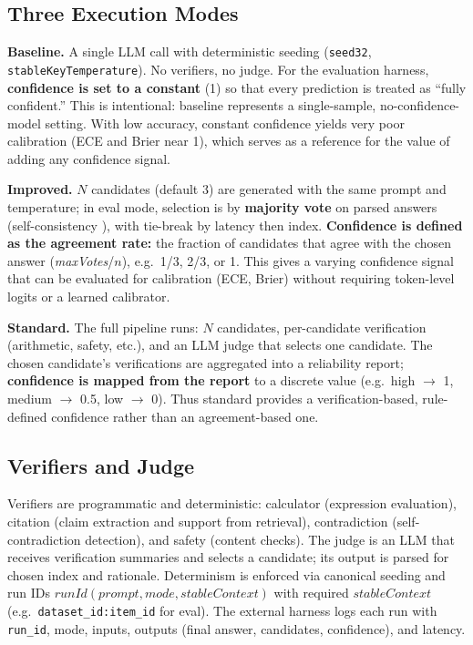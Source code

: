 \documentclass[10pt]{article}
\begin{document}
\subsection{Three Execution Modes}
\textbf{Baseline.} A single LLM call with deterministic seeding (\texttt{seed32}, \texttt{stableKeyTemperature}). No verifiers, no judge. For the evaluation harness, \textbf{confidence is set to a constant} (1) so that every prediction is treated as ``fully confident.'' This is intentional: baseline represents a single-sample, no-confidence-model setting. With low accuracy, constant confidence yields very poor calibration (ECE and Brier near 1), which serves as a reference for the value of adding any confidence signal.

\textbf{Improved.} $N$ candidates (default 3) are generated with the same prompt and temperature; in eval mode, selection is by \textbf{majority vote} on parsed answers (self-consistency \citep{wang2023selfconsistency}), with tie-break by latency then index. \textbf{Confidence is defined as the agreement rate:} the fraction of candidates that agree with the chosen answer (\textit{maxVotes}/$n$), e.g.\ 1/3, 2/3, or 1. This gives a varying confidence signal that can be evaluated for calibration (ECE, Brier) without requiring token-level logits or a learned calibrator.

\textbf{Standard.} The full pipeline runs: $N$ candidates, per-candidate verification (arithmetic, safety, etc.), and an LLM judge that selects one candidate. The chosen candidate's verifications are aggregated into a reliability report; \textbf{confidence is mapped from the report} to a discrete value (e.g.\ high $\to$ 1, medium $\to$ 0.5, low $\to$ 0). Thus standard provides a verification-based, rule-defined confidence rather than an agreement-based one.

\subsection{Verifiers and Judge}
Verifiers are programmatic and deterministic: calculator (expression evaluation), citation (claim extraction and support from retrieval), contradiction (self-contradiction detection), and safety (content checks). The judge is an LLM that receives verification summaries and selects a candidate; its output is parsed for chosen index and rationale. Determinism is enforced via canonical seeding and run IDs $\mathit{runId}(\mathit{prompt}, \mathit{mode}, \mathit{stableContext})$ with required $\mathit{stableContext}$ (e.g.\ \texttt{dataset\_id:item\_id} for eval). The external harness logs each run with \texttt{run\_id}, mode, inputs, outputs (final answer, candidates, confidence), and latency.
\end{document}
